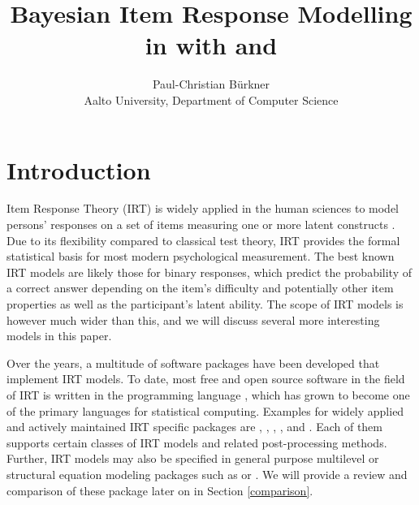 \documentclass[jss]{jss}
\author{
Paul-Christian Bürkner\\Aalto University, Department of Computer Science
}
\title{Bayesian Item Response Modelling in \proglang{R} with \pkg{brms} and
\proglang{Stan}}
\begin{document}
\hypertarget{introduction}{%
\section{Introduction}\label{introduction}}

Item Response Theory (IRT) is widely applied in the human sciences to
model persons' responses on a set of items measuring one or more latent
constructs \citep[for a comprehensive introduction
see][]{lord2012, embretson2013, vanderlinden2013}. Due to its
flexibility compared to classical test theory, IRT provides the formal
statistical basis for most modern psychological measurement. The best
known IRT models are likely those for binary responses, which predict
the probability of a correct answer depending on the item's difficulty
and potentially other item properties as well as the participant's
latent ability. The scope of IRT models is however much wider than this,
and we will discuss several more interesting models in this paper.

Over the years, a multitude of software packages have been developed
that implement IRT models. To date, most free and open source software
in the field of IRT is written in the programming language 
\citep{R}, which has grown to become one of the primary languages for
statistical computing. Examples for widely applied and actively
maintained IRT specific  packages are  \citep{eRm},
 \citep{ltm},  \citep{TAM},  \citep{mirt},
and  \citep{sirt}. Each of them supports certain classes of
IRT models and related post-processing methods. Further, IRT models may
also be specified in general purpose multilevel or structural equation
modeling packages such as  \citep{lme4} or 
\citep{lavaan}. We will provide a review and comparison of these package
later on in Section \ref{comparison}.
\end{document}
